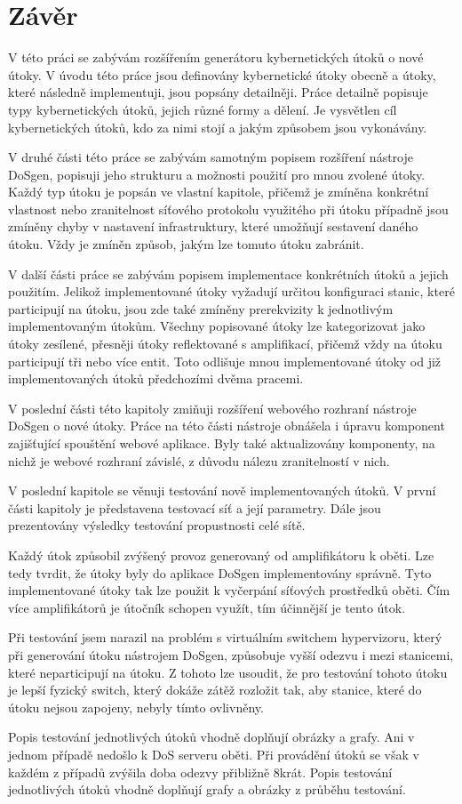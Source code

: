 \chapter{Závěr}
V této práci se zabývám rozšířením generátoru kybernetických útoků o nové útoky. V úvodu této práce jsou definovány kybernetické útoky obecně a útoky, které následně implementuji, jsou popsány detailněji. Práce detailně popisuje typy kybernetických útoků, jejich různé formy a dělení. Je vysvětlen cíl kybernetických útoků, kdo za nimi stojí a jakým způsobem jsou vykonávány.

V druhé části této práce se zabývám samotným popisem rozšíření nástroje DoSgen, popisuji jeho strukturu a možnosti použití pro mnou zvolené útoky. Každý typ útoku je popsán ve vlastní kapitole, přičemž je zmíněna konkrétní vlastnost nebo zranitelnost síťového protokolu využitého při útoku případně jsou zmíněny chyby v nastavení infrastruktury, které umožňují sestavení daného útoku. Vždy je zmíněn způsob, jakým lze tomuto útoku zabránit.

V další části práce se zabývám popisem implementace konkrétních útoků a jejich použitím. Jelikož implementované útoky vyžadují určitou konfiguraci stanic, které participují na útoku, jsou zde také zmíněny prerekvizity k jednotlivým implementovaným útokům. Všechny popisované útoky lze kategorizovat jako útoky zesílené, přesněji útoky reflektované s amplifikací, přičemž vždy na útoku participují tři nebo více entit. Toto odlišuje mnou implementované útoky od již implementovaných útoků předchozími dvěma pracemi.

V poslední části této kapitoly zmiňuji rozšíření webového rozhraní nástroje DoSgen o nové útoky. Práce na této části nástroje obnášela i úpravu komponent zajišťující spouštění webové aplikace. Byly také aktualizovány komponenty, na nichž je webové rozhraní závislé, z důvodu nálezu zranitelností v nich.

V poslední kapitole se věnuji testování nově implementovaných útoků. V první části kapitoly je představena testovací síť a její parametry. Dále jsou prezentovány výsledky testování propustnosti celé sítě.

Každý útok způsobil zvýšený provoz generovaný od amplifikátoru k oběti. Lze tedy tvrdit, že útoky byly do aplikace DoSgen implementovány správně. Tyto implementované útoky tak lze použit k vyčerpání síťových prostředků oběti. Čím více amplifikátorů je útočník schopen využít, tím účinnější je tento útok.

Při testování jsem narazil na problém s virtuálním switchem hypervizoru, který při generování útoku nástrojem DoSgen, způsobuje vyšší odezvu i mezi stanicemi, které neparticipují na útoku. Z tohoto lze usoudit, že pro testování tohoto útoku je lepší fyzický switch, který dokáže zátěž rozložit tak, aby stanice, které do útoku nejsou zapojeny, nebyly tímto ovlivněny.

Popis testování jednotlivých útoků vhodně doplňují obrázky a grafy.
Ani v jednom případě nedošlo k DoS serveru oběti. Při provádění útoků se však v každém z případů zvýšila doba odezvy přibližně 8krát. Popis testování jednotlivých útoků vhodně doplňují grafy a obrázky z průběhu testování.
